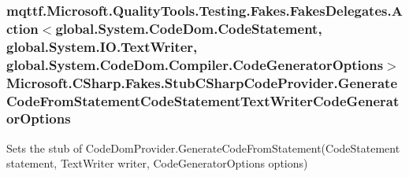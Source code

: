 \hypertarget{class_microsoft_1_1_c_sharp_1_1_fakes_1_1_stub_c_sharp_code_provider_adcb755b1cac0a6874fb5320a4fa1fb48}{
\subsubsection[{Generate\-Code\-From\-Statement\-Code\-Statement\-Text\-Writer\-Code\-Generator\-Options}]{\setlength{\rightskip}{0pt plus 5cm}mqttf.\-Microsoft.\-Quality\-Tools.\-Testing.\-Fakes.\-Fakes\-Delegates.\-Action$<$global.\-System.\-Code\-Dom.\-Code\-Statement, global.\-System.\-I\-O.\-Text\-Writer, global.\-System.\-Code\-Dom.\-Compiler.\-Code\-Generator\-Options$>$ Microsoft.\-C\-Sharp.\-Fakes.\-Stub\-C\-Sharp\-Code\-Provider.\-Generate\-Code\-From\-Statement\-Code\-Statement\-Text\-Writer\-Code\-Generator\-Options}}\label{class_microsoft_1_1_c_sharp_1_1_fakes_1_1_stub_c_sharp_code_provider_adcb755b1cac0a6874fb5320a4fa1fb48}


Sets the stub of Code\-Dom\-Provider.\-Generate\-Code\-From\-Statement(\-Code\-Statement statement, Text\-Writer writer, Code\-Generator\-Options options)

